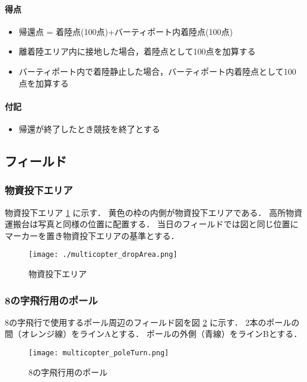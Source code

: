 \paragraph{得点}
\begin{itemize}
\item 帰還点 = 着陸点(100点)+バーティポート内着陸点(100点)
\item 離着陸エリア内に接地した場合，着陸点として100点を加算する
\item バーティポート内で着陸静止した場合，バーティポート内着陸点として100点を加算する
\end{itemize}
\paragraph{付記}
\begin{itemize}
\item 帰還が終了したとき競技を終了とする
\end{itemize}


\subsection{フィールド}
\subsubsection{物資投下エリア}
物資投下エリア \ref{fig::multicopter::dropArea} に示す．
黄色の枠の内側が物資投下エリアである．
高所物資運搬台は写真と同様の位置に配置する．
当日のフィールドでは図と同じ位置にマーカーを置き物資投下エリアの基準とする．
\begin{figure}[ht]
  \centering\texttt{[image: ./multicopter\_dropArea.png]}
  \caption{物資投下エリア}
  \label{fig::multicopter::dropArea}
\end{figure}

\newpage
\subsubsection{8の字飛行用のポール}
8の字飛行で使用するポール周辺のフィールド図を図 \ref{fig::multicopter::poleTurn} に示す．
2本のポールの間（オレンジ線）をラインAとする．
ポールの外側（青線）をラインBとする．
\begin{figure}[h]
  \centering\texttt{[image: multicopter\_poleTurn.png]}
  \caption{8の字飛行用のポール}
  \label{fig::multicopter::poleTurn}
\end{figure}